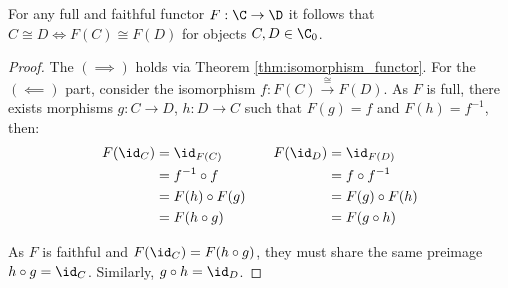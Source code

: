 \begin{theorem}\label{thm:full_faithful_isomorphism}
  For any full and faithful functor $F:\C\to \D$ it follows that $C \cong D
  \iff F(C) \cong F(D)$ for objects $C, D\in \C_0$.

  \begin{proof}
    The $(\implies)$ holds via Theorem \ref{thm:isomorphism_functor}. For the
    $(\impliedby)$ part, consider the isomorphism $f: F(C) \overset{\cong}{\to}
    F(D)$. As $F$ is full, there exists morphisms $g:C\to D$, $h:D\to C$
    such that $F(g) = f$ and $F(h) = f^{-1}$, then:
    \[
      \begin{aligned}
        F(\id_C)
        &= \id_{F(C)}\\
        &= f^{-1} \circ f\\
        &= F(h) \circ F(g)\\
        &= F(h\circ g)
      \end{aligned}
      \qquad
      \begin{aligned}
        F(\id_{D})
        &= \id_{F(D)}\\
        &= f \circ f^{-1}\\
        &= F(g) \circ F(h)\\
        &= F(g\circ h)
      \end{aligned}
    \]

    As $F$ is faithful and $F(\id_C) = F(h\circ g)$, they must share the same
    preimage $h\circ g = \id_C$. Similarly, $g\circ h = \id_{D}$.
  \end{proof}
\end{theorem}